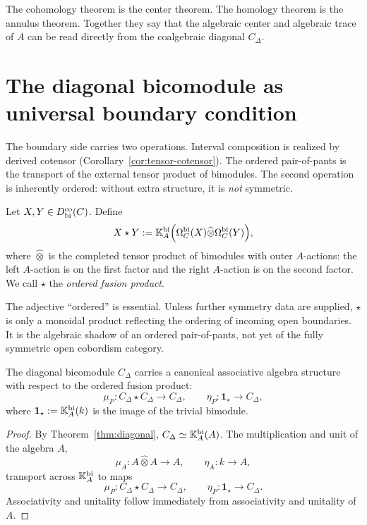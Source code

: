 \begin{remark}
The cohomology theorem is the center theorem. The homology theorem is the annulus theorem. Together
they say that the algebraic center and algebraic trace of $A$ can be read directly from the
coalgebraic diagonal $C_\Delta$.
\end{remark}

\section{The diagonal bicomodule as universal boundary condition}
\label{sec:open-trace}

The boundary side carries two operations.
Interval composition is realized by derived cotensor
(Corollary~\ref{cor:tensor-cotensor}). The ordered pair-of-pants
is the transport of the external tensor product of bimodules.
The second operation is inherently ordered: without extra structure,
it is \emph{not} symmetric.

\begin{definition}
Let $X,Y\in D^{\mathrm{co}}_{\mathrm{bi}}(C)$. Define
\[
X\star Y
:=
\mathbb{K}_A^{\mathrm{bi}}\Bigl(
\Omega_C^{\mathrm{bi}}(X)\widehat\otimes \Omega_C^{\mathrm{bi}}(Y)
\Bigr),
\]
where $\widehat\otimes$ is the completed tensor product of bimodules with outer $A$-actions:
the left $A$-action is on the first factor and the right $A$-action is on the second factor.
We call $\star$ the \emph{ordered fusion product}.
\end{definition}

\begin{remark}
The adjective ``ordered'' is essential. Unless further symmetry data are supplied, $\star$ is only
a monoidal product reflecting the ordering of incoming open boundaries. It is the algebraic shadow
of an ordered pair-of-pants, not yet of the fully symmetric open cobordism category.
\end{remark}

\begin{theorem}
\ClaimStatusProvedHere
\label{thm:pair-of-pants}
The diagonal bicomodule $C_\Delta$ carries a canonical associative algebra structure with respect to
the ordered fusion product:
\[
\mu_P:C_\Delta\star C_\Delta\longrightarrow C_\Delta,
\qquad
\eta_P:\mathbf 1_\star\longrightarrow C_\Delta,
\]
where $\mathbf 1_\star:=\mathbb{K}_A^{\mathrm{bi}}(k)$ is the image of the trivial bimodule.
\end{theorem}

\begin{proof}
By Theorem~\ref{thm:diagonal}, $C_\Delta\simeq \mathbb{K}_A^{\mathrm{bi}}(A)$. The multiplication and unit
of the algebra $A$,
\[
\mu_A:A\widehat\otimes A\to A,\qquad \eta_A:k\to A,
\]
transport across $\mathbb{K}_A^{\mathrm{bi}}$ to maps
\[
\mu_P:C_\Delta\star C_\Delta\to C_\Delta,\qquad \eta_P:\mathbf 1_\star\to C_\Delta.
\]
Associativity and unitality follow immediately from associativity and unitality of $A$.
\end{proof}

